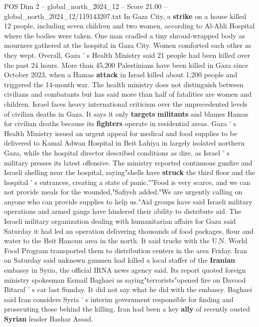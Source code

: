 \begin{textsample}{POS Dim 2 – global\_north\_2024\_12 – Score 21.00 – global\_north\_2024\_12/119143207.txt}
In Gaza City, a \textbf{strike} on a house killed 12 people, including seven children and two women, according to Al-Ahli Hospital where the bodies were taken.
One man cradled a tiny shroud-wrapped body as mourners gathered at the hospital in Gaza City.
Women comforted each other as they wept.
Overall, Gaza ' s Health Ministry said 21 people had been killed over the past 24 hours.
More than 45,200 Palestinians have been killed in Gaza since October 2023, when a Hamas \textbf{attack} in Israel killed about 1,200 people and triggered the 14-month war.
The health ministry does not distinguish between civilians and combatants but has said more than half of fatalities are women and children.
Israel faces heavy international criticism over the unprecedented levels of civilian deaths in Gaza.
It says it only \textbf{targets} \textbf{militants} and blames Hamas for civilian deaths because its \textbf{fighters} operate in residential areas.
Gaza ' s Health Ministry issued an urgent appeal for medical and food supplies to be delivered to Kamal Adwan Hospital in Beit Lahiya in largely isolated northern Gaza, while the hospital director described conditions as dire, as Israel ' s military presses its latest offensive.
The ministry reported continuous gunfire and Israeli shelling near the hospital, saying"shells have \textbf{struck} the third floor and the hospital ' s entrances, creating a state of panic.""Food is very scarce, and we can not provide meals for the wounded,"Safiyeh added."We are urgently calling on anyone who can provide supplies to help us."Aid groups have said Israeli military operations and armed gangs have hindered their ability to distribute aid.
The Israeli military organization dealing with humanitarian affairs for Gaza said Saturday it had led an operation delivering thousands of food packages, flour and water to the Beit Hanoun area in the north.
It said trucks with the U.N.
World Food Program transported them to distribution centers in the area Friday.
Iran on Saturday said unknown gunmen had killed a local staffer of the \textbf{Iranian} embassy in Syria, the official IRNA news agency said.
Its report quoted foreign ministry spokesman Esmail Baghaei as saying"terrorists"opened fire on Davood Bitaraf ' s car last Sunday.
It did not say what he did with the embassy.
Baghaei said Iran considers Syria ' s interim government responsible for finding and prosecuting those behind the killing.
Iran had been a key \textbf{ally} of recently ousted \textbf{Syrian} leader Bashar Assad.

\end{textsample}
